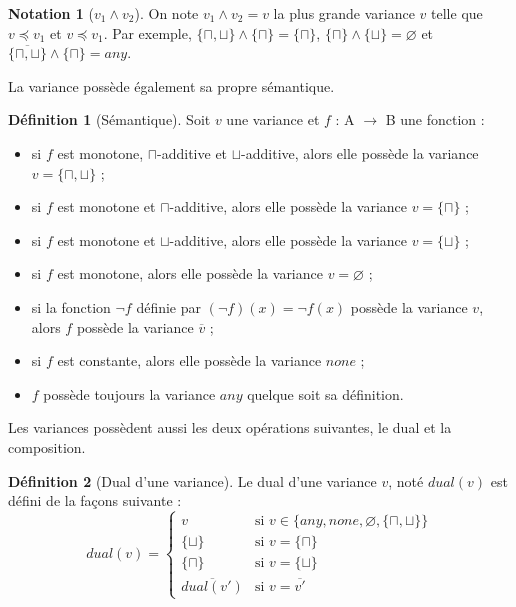 \documentclass{rapport}
\theoremstyle{plain}
\theoremstyle{remark}
\theoremstyle{definition}
\newtheorem{notat}{Notation}
\newtheorem{dfn}{Définition}
\begin{document}
\begin{notat} [$v_1 \wedge v_2$] On note $v_1 \wedge v_2 = v$ la plus grande variance $v$ telle que $v \preccurlyeq v_1$ et $v \preccurlyeq v_1$. Par exemple, $\{\sqcap, \sqcup\} \wedge \{\sqcap\} = \{\sqcap\}$, $\{\sqcap\} \wedge \{\sqcup\} = \varnothing$ et $\overline{\{\sqcap, \sqcup\}} \wedge \{\sqcap\} = any$.
\end{notat}

La variance possède également sa propre sémantique. 

\begin{dfn} [Sémantique] Soit $v$ une variance et $f$ : A $\rightarrow$ B une fonction : 
\begin{itemize}
	\item si $f$ est monotone, $\sqcap$-additive et $\sqcup$-additive, alors elle possède la variance $v = \{\sqcap, \sqcup\}$ ;
	\item si $f$ est monotone et $\sqcap$-additive, alors elle possède la variance $v = \{\sqcap\}$ ;
	\item si $f$ est monotone et $\sqcup$-additive, alors elle possède la variance $v = \{\sqcup\}$ ;
	\item si $f$ est monotone, alors elle possède la variance $v = \varnothing$ ;
	\item si la fonction $\neg f$ définie par $(\neg f)(x) = \neg f(x)$ possède la variance $v$, alors $f$ possède la variance $\overline{v}$ ;
	\item si $f$ est constante, alors elle possède la variance $none$ ;
	\item $f$ possède toujours la variance $any$ quelque soit sa définition.
\end{itemize}
\end{dfn}

Les variances possèdent aussi les deux opérations suivantes, le dual et la composition.  

\begin{dfn} [Dual d'une variance] Le dual d'une variance $v$, noté $dual(v)$ est défini de la façons suivante : 
\[dual(v) = \left\{
\begin{array}{ll}
v & \text{si }v \in \{any, none, \varnothing, \{\sqcap, \sqcup\}\}\\
\{\sqcup\} & \text{si }v = \{\sqcap\}\\
\{\sqcap\} & \text{si }v = \{\sqcup\}\\
\overline{dual(v')} & \text{si }v = \overline{v'}
\end{array}\right.\]
\end{dfn}
\end{document}
